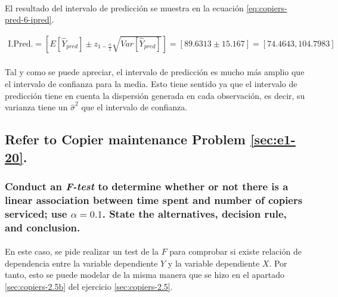 \documentclass{article}
\begin{document}
        \paragraph{}
        El resultado del intervalo de predicción se muestra en la ecuación \eqref{eq:copiers-pred-6-ipred}.

        \begin{equation}
          \label{eq:copiers-pred-6-ipred}
          \begin{split}
            \text{I.Pred.}
            = \left[E[\widehat{Y}_{pred}] \pm z_{1-\frac{\alpha}{2}}\sqrt{Var\left[\widehat{Y}_{pred}\right]}\right]
            = \left[89.6313 \pm 15.167\right]
            = \left[74.4643, 104.7983\right]
          \end{split}
        \end{equation}

        \paragraph{}
        Tal y como se puede apreciar, el intervalo de predicción es mucho más amplio que el intervalo de confianza para la media. Esto tiene sentido ya que el intervalo de predicción tiene en cuenta la dispersión generada en cada observación, es decir, su varianza tiene un $\widehat{\sigma}^2$  que el intervalo de confianza.

    \setcounter{subsection}{23}
    \subsection{Refer to \textbf{Copier maintenance} Problem \ref{sec:e1-20}.}
    \label{sec:copiers-2.24}

      \setcounter{subsubsection}{1}
      \subsubsection{Conduct an \emph{F-test} to determine whether or not there is a linear association between time spent and number of copiers serviced; use $\alpha = 0.1$. State the alternatives, decision rule, and conclusion.}
      \label{sec:copiers-2.24b}

        \paragraph{}
        En este caso, se pide realizar un test de la $F$ para comprobar si existe relación de dependencia entre la variable dependiente $Y$ y la variable dependiente $X$. Por tanto, esto se puede modelar de la misma manera que se hizo en el apartado \ref{sec:copiers-2.5b} del ejercicio \ref{sec:copiers-2.5}.
\end{document}
